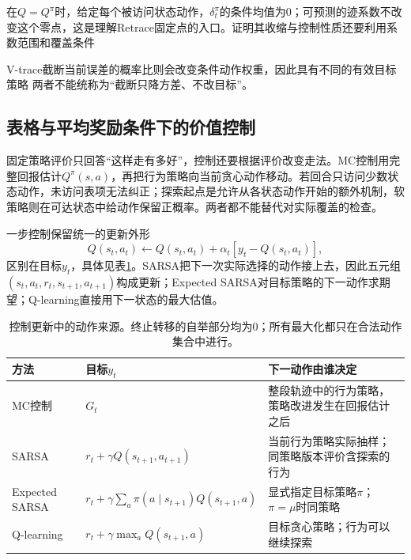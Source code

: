 在$Q=Q^\pi$时，给定每个被访问状态动作，$\delta_t^\pi$的条件均值为0；可预测的迹系数不改变这个零点，这是理解Retrace固定点的入口。证明其收缩与控制性质还要利用系数范围和覆盖条件

V-trace截断当前误差的概率比则会改变条件动作权重，因此具有不同的有效目标策略
两者不能统称为“截断只降方差、不改目标”。

\subsection{表格与平均奖励条件下的价值控制}
\label{sec:rl-learning-tabular-control}

固定策略评价只回答“这样走有多好”，控制还要根据评价改变走法。MC控制用完整回报估计$Q^\pi(s,a)$，再把行为策略向当前贪心动作移动。若回合只访问少数状态动作，未访问表项无法纠正；探索起点是允许从各状态动作开始的额外机制，软策略则在可达状态中给动作保留正概率。两者都不能替代对实际覆盖的检查。

一步控制保留统一的更新外形
\begin{equation}
  Q(s_t,a_t)\leftarrow Q(s_t,a_t)
        +\alpha_t[y_t-Q(s_t,a_t)],
  \label{eq:rl-learning-control-update}
\end{equation}
区别在目标$y_t$，具体见表\ref{tab:rl-learning-control-targets}。SARSA把下一次实际选择的动作接上去，因此五元组$(s_t,a_t,r_t,s_{t+1},a_{t+1})$构成更新；Expected SARSA对目标策略的下一动作求期望；Q-learning直接用下一状态的最大估值。

\begin{table}[t]
  \centering
  \small
  \begin{tabularx}{\linewidth}{>{\raggedright\arraybackslash}p{28mm} >{\raggedright\arraybackslash}X >{\raggedright\arraybackslash}X}
    \toprule
    方法 & 目标$y_t$ & 下一动作由谁决定 \\
    \midrule
    MC控制 & $G_t$ & 整段轨迹中的行为策略，策略改进发生在回报估计之后 \\
    SARSA & $r_t+\gamma Q(s_{t+1},a_{t+1})$ & 当前行为策略实际抽样；同策略版本评价含探索的行为 \\
    Expected SARSA & $r_t+\gamma\sum_a\pi(a\mid s_{t+1})Q(s_{t+1},a)$ & 显式指定目标策略$\pi$；$\pi=\mu$时同策略 \\
    Q-learning & $r_t+\gamma\max_aQ(s_{t+1},a)$ & 目标贪心策略；行为可以继续探索 \\
    \bottomrule
  \end{tabularx}
  \caption{控制更新中的动作来源。终止转移的自举部分均为0；所有最大化都只在合法动作集合中进行。}
  \label{tab:rl-learning-control-targets}
\end{table}

